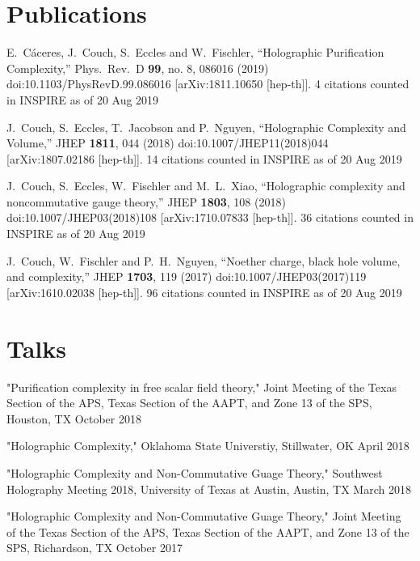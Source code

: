 \documentclass[letterpaper]{article}
\renewenvironment{itemize}{
  \begin{list}{}{
    \setlength{\leftmargin}{1.5em}
  }
}{
  \end{list}
}
\begin{document}
\section*{Publications}
\begin{itemize}

\item 
  E.~Cáceres, J.~Couch, S.~Eccles and W.~Fischler,
  ``Holographic Purification Complexity,''
  Phys.\ Rev.\ D {\bf 99}, no. 8, 086016 (2019)
  doi:10.1103/PhysRevD.99.086016
  [arXiv:1811.10650 [hep-th]].
  4 citations counted in INSPIRE as of 20 Aug 2019

\item 
  J.~Couch, S.~Eccles, T.~Jacobson and P.~Nguyen,
  ``Holographic Complexity and Volume,''
  JHEP {\bf 1811}, 044 (2018)
  doi:10.1007/JHEP11(2018)044
  [arXiv:1807.02186 [hep-th]].
  14 citations counted in INSPIRE as of 20 Aug 2019
  
\item
  J.~Couch, S.~Eccles, W.~Fischler and M.~L.~Xiao,
  ``Holographic complexity and noncommutative gauge theory,''
  JHEP {\bf 1803}, 108 (2018)
  doi:10.1007/JHEP03(2018)108
  [arXiv:1710.07833 [hep-th]].
  36 citations counted in INSPIRE as of 20 Aug 2019

\item  
  J.~Couch, W.~Fischler and P.~H.~Nguyen,
  ``Noether charge, black hole volume, and complexity,''
  JHEP {\bf 1703}, 119 (2017)
  doi:10.1007/JHEP03(2017)119
  [arXiv:1610.02038 [hep-th]].
  96 citations counted in INSPIRE as of 20 Aug 2019

  
\end{itemize}

\section*{Talks}
\begin{itemize}

\item "Purification complexity in free scalar field theory," Joint Meeting of the Texas Section of the APS, Texas Section of the AAPT, and Zone 13 of the SPS, Houston, TX \hfill October 2018

\item "Holographic Complexity," Oklahoma State Universtiy, Stillwater, OK \hfill April 2018

\item "Holographic Complexity and Non-Commutative Guage Theory," Southwest Holography Meeting 2018, University of Texas at Austin, Austin, TX \hfill March 2018

\item "Holographic Complexity and Non-Commutative Guage Theory," Joint Meeting of the Texas Section of the APS, Texas Section of the AAPT, and Zone 13 of the SPS, Richardson, TX \hfill October 2017

\end{itemize}
\end{document}
